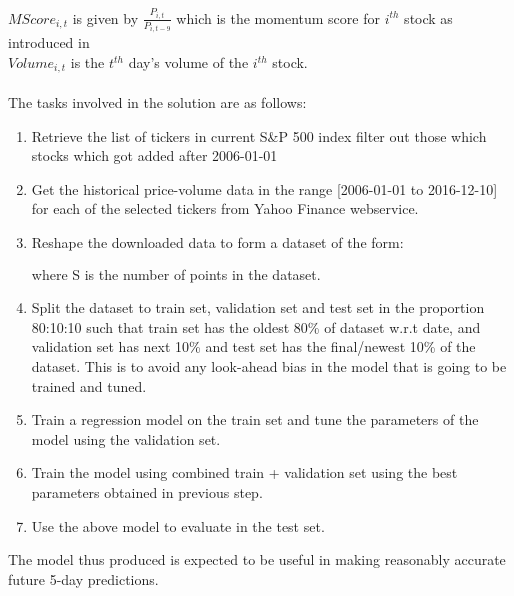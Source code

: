 \documentclass[10pt]{report}
\begin{document}
$MScore_{i,t}$ is given by $\frac{P_{i,t}}{P_{i, t-9}}$ which is the momentum score for $i^{th}$ stock as introduced in \cite{mlfortrading}\\
$Volume_{i,t}$ is the $t^{th}$ day's volume of the $i^{th}$ stock.\\
\\
The tasks involved in the solution are as follows:
\begin{enumerate}
\item Retrieve the list of tickers in current S\&P 500 index filter out those which stocks which got added after 2006-01-01
\item Get the historical price-volume data in the range [2006-01-01 to 2016-12-10] for each of the selected tickers from Yahoo Finance webservice.
\item Reshape the downloaded data to form a dataset of the form: 
\begin{align*}
[&(feature_1, feature_2, ..., feature_n, target)_{t=0},\\
 &(feature_1, feature_2, ..., feature_n, target)_{t=1},\\
 &...\\
 &(feature_1, feature_2, ..., feature_n, target)_{t=S}]\\
\end{align*} where S is the number of points in the dataset.
\item Split the dataset to train set, validation set and test set in the proportion 80:10:10 such that train set has the oldest 80\% of dataset w.r.t date, and validation set has next 10\% and test set has the final/newest 10\% of the dataset. This is to avoid any look-ahead bias in the model that is going to be trained and tuned.
\item Train a regression model on the train set and tune the parameters of the model using the validation set.
\item Train the model using combined train + validation set using the best parameters obtained in previous step.
\item Use the above model to evaluate in the test set.
\end{enumerate}
The model thus produced is expected to be useful in making reasonably accurate future 5-day predictions.
\end{document}
